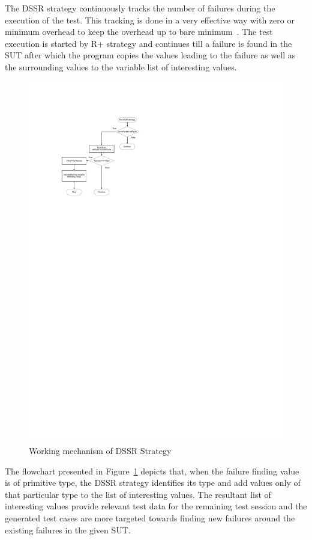 \documentclass{acm_proc_article-sp}
\begin{document}
The DSSR strategy continuously tracks the number of failures during the execution of the test. This tracking is done in a very effective way with zero or minimum overhead to keep the overhead up to bare minimum~\cite{Leitner2009}. The test execution is started by R+ strategy and continues till a failure is found in the SUT after which the program copies the values leading to the failure as well as the surrounding values to the variable list of interesting values. 

\begin{figure}[ht]
\centering
\includegraphics[width=\columnwidth]{flowchart1.pdf}
\caption{Working mechanism of DSSR Strategy}
\label{fig:Working_DSSS}
\end{figure}

The flowchart presented in Figure~\ref{fig:Working_DSSS} depicts that, when the failure finding value is of primitive type, the DSSR strategy identifies its type and add values only of that particular type to the list of interesting values. The resultant list of interesting values provide relevant test data for the remaining test session and the generated test cases are more targeted towards finding new failures around the existing failures in the given SUT.
\end{document}
